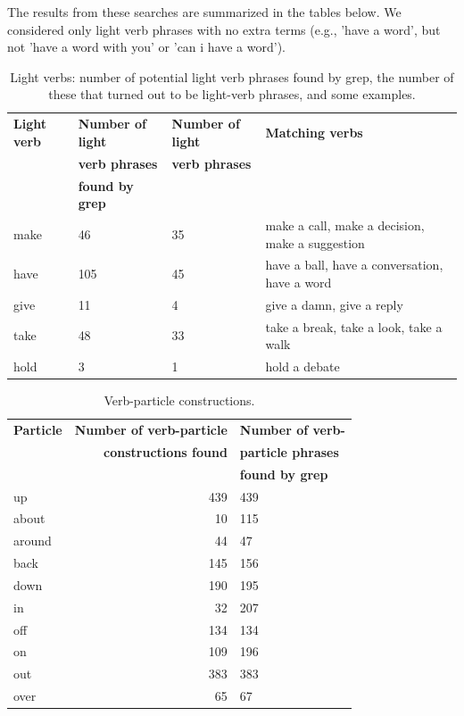\documentclass[11pt]{article}
\begin{document}
The results from these searches are summarized in the tables below. We considered only light verb phrases with no extra terms (e.g., 'have a word', but not 'have a word with you' or 'can i have a word').

\begin{center}
\begin{table}
\hfill{}
\begin{tabular}{|l|l|l|l|}
\hline \bf Light verb & \bf Number of light & \bf Number of light & \bf Matching verbs\\ 
 & \bf verb phrases & \bf verb phrases & \\ 
 & \bf  found by grep & & \\ \hline
make & 46 & 35 & make a call, make a decision, make a suggestion\\
have & 105 & 45 & have a ball, have a conversation, have a word\\
give & 11 & 4 & give a damn, give a reply\\
take & 48 & 33 & take a break, take a look, take a walk\\
hold & 3 & 1 & hold a debate\\
\hline
\end{tabular}
\hfill{}
\caption{Light verbs: number of potential light verb phrases found by grep, the number of these that turned out to be light-verb phrases, and some examples. }
\label{light-verbs}
\end{table}
\end{center}

\begin{table}[h]
\begin{center}
\begin{tabular}{|l|r|l|}
\hline \bf Particle & \bf Number of verb-particle  & \bf Number of verb-\\ 
 & \bf constructions found & \bf  particle phrases \\ 
& & \bf found by grep \\ \hline
up & 439 & 439 \\
about & 10 & 115 \\
around & 44 & 47 \\
back & 145 & 156 \\
down & 190 & 195 \\
in & 32 & 207 \\
off & 134 & 134 \\
on & 109 & 196 \\
out & 383 & 383 \\
over & 65 & 67 \\
\hline
\end{tabular}
\end{center}
\caption{\label{font-table} Verb-particle constructions. }
\end{table}
\end{document}
